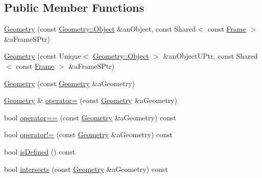 \subsection*{Public Member Functions}
\begin{DoxyCompactItemize}
\item 
\hyperlink{classlibrary_1_1physics_1_1env_1_1object_1_1_geometry_a150ec4f85fe2c76471833df4145b96e8}{Geometry} (const \hyperlink{classlibrary_1_1physics_1_1env_1_1object_1_1_geometry_a4889a934df09768235fa2d89d0b0b0d6}{Geometry\+::\+Object} \&an\+Object, const Shared$<$ const \hyperlink{classlibrary_1_1physics_1_1coord_1_1_frame}{Frame} $>$ \&a\+Frame\+S\+Ptr)
\item 
\hyperlink{classlibrary_1_1physics_1_1env_1_1object_1_1_geometry_af793dcd81d89096156cfbae25d39a12a}{Geometry} (const Unique$<$ \hyperlink{classlibrary_1_1physics_1_1env_1_1object_1_1_geometry_a4889a934df09768235fa2d89d0b0b0d6}{Geometry\+::\+Object} $>$ \&an\+Object\+U\+Ptr, const Shared$<$ const \hyperlink{classlibrary_1_1physics_1_1coord_1_1_frame}{Frame} $>$ \&a\+Frame\+S\+Ptr)
\item 
\hyperlink{classlibrary_1_1physics_1_1env_1_1object_1_1_geometry_ae686db5e0a555caf7636596a4b96495c}{Geometry} (const \hyperlink{classlibrary_1_1physics_1_1env_1_1object_1_1_geometry}{Geometry} \&a\+Geometry)
\item 
\hyperlink{classlibrary_1_1physics_1_1env_1_1object_1_1_geometry}{Geometry} \& \hyperlink{classlibrary_1_1physics_1_1env_1_1object_1_1_geometry_ac2c0d8cbdf9a6828fdd05024fc6ddad7}{operator=} (const \hyperlink{classlibrary_1_1physics_1_1env_1_1object_1_1_geometry}{Geometry} \&a\+Geometry)
\item 
bool \hyperlink{classlibrary_1_1physics_1_1env_1_1object_1_1_geometry_a30698963aff142ce94be27205e4ace24}{operator==} (const \hyperlink{classlibrary_1_1physics_1_1env_1_1object_1_1_geometry}{Geometry} \&a\+Geometry) const
\item 
bool \hyperlink{classlibrary_1_1physics_1_1env_1_1object_1_1_geometry_aab7132adf31bf6bd03dcdad46b767765}{operator!=} (const \hyperlink{classlibrary_1_1physics_1_1env_1_1object_1_1_geometry}{Geometry} \&a\+Geometry) const
\item 
bool \hyperlink{classlibrary_1_1physics_1_1env_1_1object_1_1_geometry_a1db567a9a36c4b6878e2d59a633f5a38}{is\+Defined} () const
\item 
bool \hyperlink{classlibrary_1_1physics_1_1env_1_1object_1_1_geometry_ac750e2584bc1564fbf1daf57a2231a5a}{intersects} (const \hyperlink{classlibrary_1_1physics_1_1env_1_1object_1_1_geometry}{Geometry} \&a\+Geometry) const

\end{DoxyCompactItemize}
